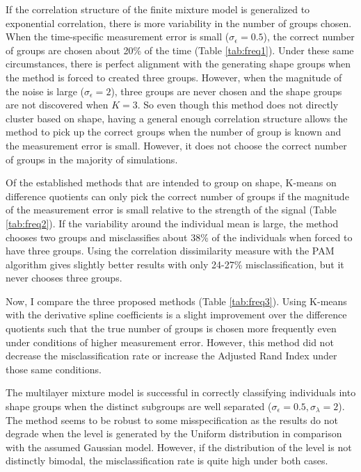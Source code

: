 If the correlation structure of the finite mixture model is generalized to exponential correlation, there is more variability in the number of groups chosen. When the time-specific measurement error is small ($\sigma_{\epsilon}=0.5$), the correct number of groups are chosen about 20\% of the time (Table \ref{tab:freq1}). Under these same circumstances, there is perfect alignment with the generating shape groups when the method is forced to created three groups. However, when the magnitude of the noise is large ($\sigma_{\epsilon}=2$), three groups are never chosen and the shape groups are not discovered when $K=3$. So even though this method does not directly cluster based on shape, having a general enough correlation structure allows the method to pick up the correct groups when the number of group is known and the measurement error is small. However, it does not choose the correct number of groups in the majority of simulations. 

Of the established methods that are intended to group on shape, K-means on difference quotients can only pick the correct number of groups if the magnitude of the measurement error is small relative to the strength of the signal (Table \ref{tab:freq2}). If the variability around the individual mean is large, the method chooses two groups and misclassifies about 38\% of the individuals when forced to have three groups. Using the correlation dissimilarity measure with the PAM algorithm gives slightly better results with only 24-27\% misclassification, but it never chooses three groups.

Now, I compare the three proposed methods (Table \ref{tab:freq3}). Using K-means with the derivative spline coefficients is a slight improvement over the difference quotients such that the true number of groups is chosen more frequently even under conditions of higher measurement error. However, this method did not decrease the misclassification rate or increase the Adjusted Rand Index under those same conditions. 

The multilayer mixture model is successful in correctly classifying individuals into shape groups when the distinct subgroups are well separated ($\sigma_{\epsilon}=0.5, \sigma_{\lambda}=2$). The method seems to be robust to some misspecification as the results do not degrade when the level is generated by the Uniform distribution in comparison with the assumed Gaussian model. However, if the distribution of the level is not distinctly bimodal, the misclassification rate is quite high under both cases.

